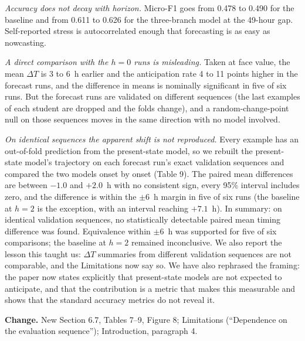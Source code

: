 \documentclass[11pt]{article}
\newcommand{\dt}{$\Delta T$}
\newcommand{\change}{\par\noindent\textbf{Change.} }
\begin{document}
\emph{Accuracy does not decay with horizon.} Micro-F1 goes from 0.478
to 0.490 for the baseline and from 0.611 to 0.626 for the three-branch
model at the 49-hour gap. Self-reported stress is autocorrelated enough
that forecasting is as easy as nowcasting.

\emph{A direct comparison with the $h = 0$ runs is misleading.} Taken at
face value, the mean \dt{} is 3 to 6~h earlier and the anticipation
rate 4 to 11 points higher in the forecast runs, and the difference in
means is nominally significant in five of six runs. But the forecast
runs are validated on different sequences (the last examples of each
student are dropped and the folds change), and a random-change-point
null on those sequences moves in the same direction with no model
involved.

\emph{On identical sequences the apparent shift is not reproduced.} Every example
has an out-of-fold prediction from the present-state model, so we
rebuilt the present-state model's trajectory on each forecast run's
exact validation sequences and compared the two models onset by onset
(Table 9). The paired mean differences are between $-1.0$ and $+2.0$~h
with no consistent sign, every 95\% interval includes zero, and the
difference is within the $\pm 6$~h margin in five of six runs (the
baseline at $h = 2$ is the exception, with an interval reaching
$+7.1$~h). In summary: on identical validation sequences, no
statistically detectable paired mean timing difference was found.
Equivalence within $\pm 6$~h was supported for five of six comparisons;
the baseline at $h = 2$ remained inconclusive. We also report the lesson this taught us: \dt{}
summaries from different validation sequences are not comparable, and
the Limitations now say so.
We have also rephrased the framing: the paper now states explicitly that
present-state models are not expected to anticipate, and that the
contribution is a metric that makes this measurable and shows that the
standard accuracy metrics do not reveal it.
\change New Section 6.7, Tables 7--9, Figure 8; Limitations (``Dependence on the evaluation sequence''); Introduction, paragraph 4.
\end{document}
